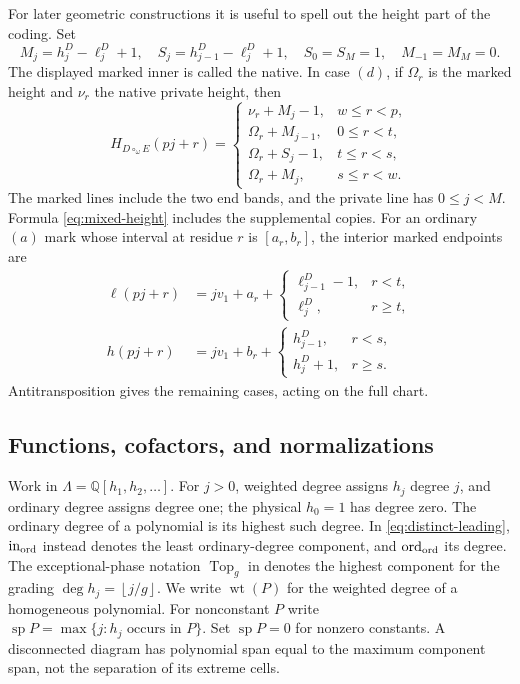 \documentclass[11pt,a4paper]{amsart}
\numberwithin{equation}{section}
\theoremstyle{plain}
\theoremstyle{definition}
\newcommand{\Lam}{\Lambda}
\newcommand{\Q}{\mathbb Q}
\newcommand{\spn}{\operatorname{sp}}
\newcommand{\ord}{\operatorname{ord}}
\newcommand{\wt}{\operatorname{wt}}
\newcommand{\floor}[1]{\left\lfloor#1\right\rfloor}
\begin{document}
For later geometric constructions it is useful to spell out the height
part of the coding.  Set
\[
 M_j=h_j^D-\ell_j^D+1,\quad
 S_j=h_{j-1}^D-\ell_j^D+1,\quad S_0=S_M=1,\quad M_{-1}=M_M=0.
\]
The displayed marked inner is called the native.
In case \((d)\), if \(\Omega_r\) is the marked height and \(\nu_r\) the native private
height, then
\begin{equation}\label{eq:mixed-height}
 H_{D\circ_\omega E}(pj+r)=
 \begin{cases}
 \nu_r+M_j-1,&w\le r<p,\\
 \Omega_r+M_{j-1},&0\le r<t,\\
 \Omega_r+S_j-1,&t\le r<s,\\
 \Omega_r+M_j,&s\le r<w.
 \end{cases}
\end{equation}
The marked lines include the two end bands, and the private line has
\(0\le j<M\).  Formula \eqref{eq:mixed-height} includes the supplemental copies.
For an ordinary \((a)\) mark whose interval at residue \(r\) is \([a_r,b_r]\), the
interior marked endpoints are
\[
\begin{aligned}
 \ell(pj+r)&=jv_1+a_r+
   \begin{cases}\ell_{j-1}^D-1,&r<t,\\ \ell_j^D,&r\ge t,\end{cases}\\
 h(pj+r)&=jv_1+b_r+
   \begin{cases}h_{j-1}^D,&r<s,\\ h_j^D+1,&r\ge s.\end{cases}
\end{aligned}
\]
Antitransposition gives the remaining cases, acting on the full chart.

\subsection{Functions, cofactors, and normalizations}

Work in \(\Lam=\Q[h_1,h_2,\ldots]\).  For \(j>0\), weighted degree
assigns \(h_j\) degree \(j\), and ordinary degree assigns degree one;
the physical \(h_0=1\) has degree zero.
The ordinary degree of a polynomial is its highest such degree.
In \eqref{eq:distinct-leading}, \(\operatorname{in}_{\rm ord}\)
instead denotes the least ordinary-degree component, and
\(\ord_{\rm ord}\) its degree.
The exceptional-phase notation \(\operatorname{Top}_g\) in
 denotes the highest component
for the grading \(\deg h_j=\floor{j/g}\).
We write \(\wt(P)\) for the weighted degree of a homogeneous polynomial.
For nonconstant \(P\) write
\(\spn P=\max\{j:h_j\text{ occurs in }P\}\).
Set \(\spn P=0\) for nonzero constants.  A disconnected diagram has polynomial span equal to the maximum component
span, not the separation of its extreme cells.
\end{document}
